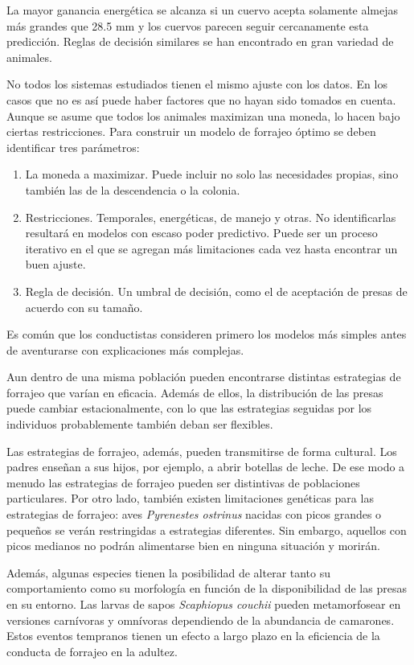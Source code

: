 \documentclass[a4paper,12pt]{article}
\begin{document}
La mayor ganancia energética se alcanza si un cuervo acepta solamente almejas más grandes que 28.5 mm y los cuervos parecen seguir cercanamente esta predicción. Reglas de decisión similares se han encontrado en gran variedad de animales.

No todos los sistemas estudiados tienen el mismo ajuste con los datos. En los casos que no es así puede haber factores que no hayan sido tomados en cuenta. Aunque se asume que todos los animales maximizan una moneda, lo hacen bajo ciertas restricciones. Para construir un modelo de forrajeo óptimo se deben identificar tres parámetros:

\begin{enumerate}
    \item La moneda a maximizar. Puede incluir no solo las necesidades propias, sino también las de la descendencia o la colonia.
    \item Restricciones. Temporales, energéticas, de manejo y otras. No identificarlas resultará en modelos con escaso poder predictivo. Puede ser un proceso iterativo en el que se agregan más limitaciones cada vez hasta encontrar un buen ajuste.
    \item Regla de decisión. Un umbral de decisión, como el de aceptación de presas de acuerdo con su tamaño.
\end{enumerate}

Es común que los conductistas consideren primero los modelos más simples antes de aventurarse con explicaciones más complejas.

Aun dentro de una misma población pueden encontrarse distintas estrategias de forrajeo que varían en eficacia. Además de ellos, la distribución de las presas puede cambiar estacionalmente, con lo que las estrategias seguidas por los individuos probablemente también deban ser flexibles.

Las estrategias de forrajeo, además, pueden transmitirse de forma cultural. Los padres enseñan a sus hijos, por ejemplo, a abrir botellas de leche. De ese modo a menudo las estrategias de forrajeo pueden ser distintivas de poblaciones particulares. Por otro lado, también existen limitaciones genéticas para las estrategias de forrajeo: aves {\itshape Pyrenestes ostrinus} nacidas con picos grandes o pequeños se verán restringidas a estrategias diferentes. Sin embargo, aquellos con picos medianos no podrán alimentarse bien en ninguna situación y morirán.

Además, algunas especies tienen la posibilidad de alterar tanto su comportamiento como su morfología en función de la disponibilidad de las presas en su entorno. Las larvas de sapos {\itshape Scaphiopus couchii} pueden metamorfosear en versiones carnívoras y omnívoras dependiendo de la abundancia de camarones. Estos eventos tempranos tienen un efecto a largo plazo en la eficiencia de la conducta de forrajeo en la adultez.
\end{document}
